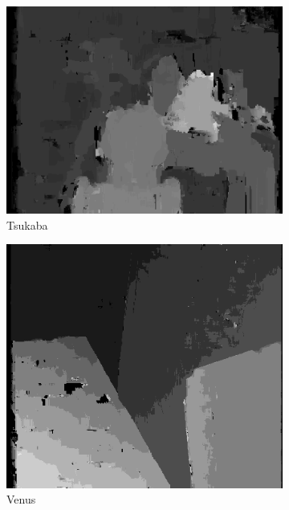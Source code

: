 \documentclass[12pt,a4paper,oneside,final]{article}
\begin{document}
\begin{figure}[H]
\begin{subfigure}[b]{0.32\textwidth}
	\includegraphics[width=\textwidth]{disparity_s4_k11set_1.png}
	\caption{Tsukaba}
\end{subfigure}
\begin{subfigure}[b]{0.32\textwidth}
	\includegraphics[width=\textwidth]{disparity_s4_k11set_2.png}
	\caption{Venus}
\end{subfigure}
\begin{subfigure}[b]{0.32\textwidth}

\end{subfigure}
\end{figure}
\end{document}
